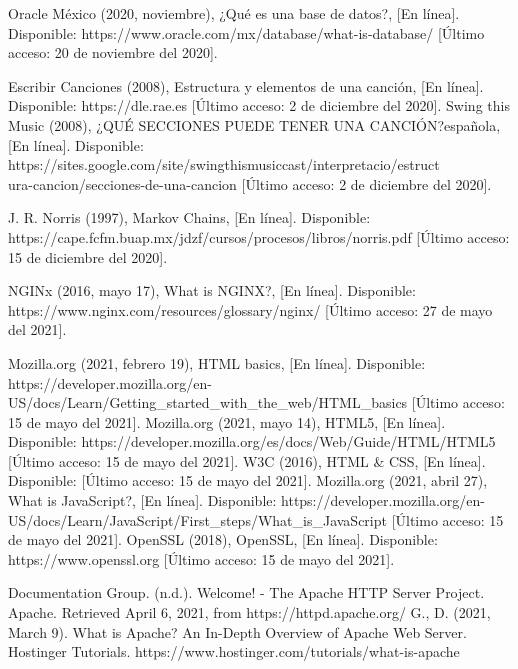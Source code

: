 \documentclass[12pt, a4paper, titlepage]{report}
\begin{document}
\begin{thebibliography}{20}
	Oracle México (2020, noviembre), ¿Qué es una base de datos?, [En línea]. Disponible: https://www.oracle.com/mx/database/what-is-database/ [Último acceso: 20 de noviembre del 2020].
	
	Escribir Canciones (2008), Estructura y elementos de una canción, [En línea]. Disponible: https://dle.rae.es [Último acceso: 2 de diciembre del 2020].
	Swing this Music (2008), ¿QUÉ SECCIONES PUEDE TENER UNA CANCIÓN?española, [En línea]. Disponible: https://sites.google.com/site/swingthismusiccast/interpretacio/estruct\\ura-cancion/secciones-de-una-cancion [Último acceso: 2 de diciembre del 2020].
	
	J. R. Norris (1997), Markov Chains, [En línea]. Disponible: https://cape.fcfm.buap.mx/jdzf/cursos/procesos/libros/norris.pdf [Último acceso: 15 de diciembre del 2020].
	
	NGINx (2016, mayo 17), What is NGINX?, [En línea]. Disponible: https://www.nginx.com/resources/glossary/nginx/ [Último acceso: 27 de mayo del 2021].
	
	
	Mozilla.org (2021, febrero 19), HTML basics, [En línea]. Disponible: https://developer.mozilla.org/en-US/docs/Learn/Getting\_started\_with\_the\_web/HTML\_basics [Último acceso: 15 de mayo del 2021].
	Mozilla.org (2021, mayo 14), HTML5, [En línea]. Disponible: https://developer.mozilla.org/es/docs/Web/Guide/HTML/HTML5 [Último acceso: 15 de mayo del 2021].
	W3C (2016), HTML \& CSS, [En línea]. Disponible: [Último acceso: 15 de mayo del 2021].
	Mozilla.org (2021, abril 27), What is JavaScript?, [En línea]. Disponible: https://developer.mozilla.org/en-US/docs/Learn/JavaScript/First\_steps/What\_is\_JavaScript [Último acceso: 15 de mayo del 2021].
	OpenSSL (2018), OpenSSL, [En línea]. Disponible: https://www.openssl.org [Último acceso: 15 de mayo del 2021].
	
	Documentation Group. (n.d.). Welcome! - The Apache HTTP Server Project. Apache. Retrieved April 6, 2021, from https://httpd.apache.org/
	G., D. (2021, March 9). What is Apache? An In-Depth Overview of Apache Web Server. Hostinger Tutorials. https://www.hostinger.com/tutorials/what-is-apache
	

\end{thebibliography}
\end{document}
